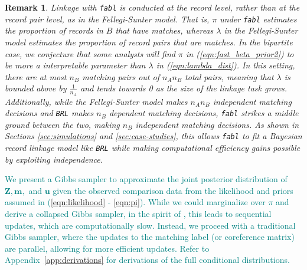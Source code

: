 \documentclass[ba]{imsart}
\newtheorem{rem}{Remark}
\begin{document}
\begin{rem}
Linkage with \texttt{fabl} is conducted at the record level, rather than at the record pair level, as in the Fellegi-Sunter model. That is, $\pi$ under \texttt{fabl} estimates the proportion of records in $B$ that have matches, whereas $\lambda$ in the Fellegi-Sunter model estimates the proportion of record pairs that are matches. In the bipartite case, we conjecture that some analysts will find $\pi$ in (\ref{eqn:fast_beta_prior2}) to be more a interpretable parameter than $\lambda$ in (\ref{eqn:lambda_dist}). In this setting, there are at most $n_B$ matching pairs out of $n_A n_B$ total pairs, meaning that $\lambda$ is bounded above by $\frac{1}{n_A}$ and tends towards 0 as the size of the linkage task grows. Additionally, while the Fellegi-Sunter model makes $n_A  n_B$ independent matching decisions and \texttt{BRL} makes $n_B$ dependent matching decisions, \texttt{fabl} strikes a middle ground between the two, making $n_B$  independent matching decisions. As shown in Sections \ref{sec:simulations} and \ref{sec:case-studies}, this allows \texttt{fabl} to fit a Bayesian record linkage model like \texttt{BRL} while making computational efficiency gains possible by exploiting independence. 
\end{rem}









\textcolor{teal}{We present a Gibbs sampler to approximate the joint posterior distribution of $\bm{Z}, \bm{m},$ and  $\bm{u}$ given the observed comparison data from the likelihood and priors assumed in (\ref{eqn:likelihood} - \ref{eqn:pi}). While we could marginalize over $\pi$ and derive a collapsed Gibbs sampler, in the spirit of \cite{sadinle_bayesian_2017}, this leads to sequential updates, which are computationally slow. Instead, we proceed with a traditional Gibbs sampler, where the updates to the matching label (or coreference matrix) are parallel, allowing for more efficient updates. Refer to Appendix~\ref{app:derivations} for derivations of the full conditional distributions.}
\end{document}
